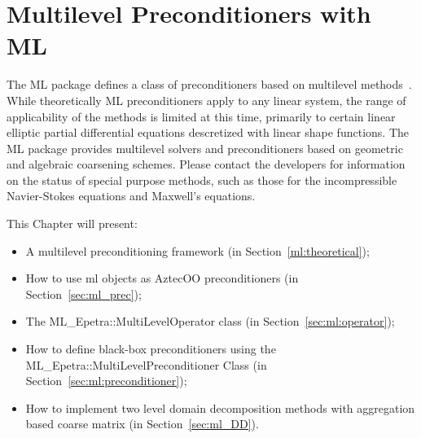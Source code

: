 % 
% 
% 
%  
%  
% 
\chapter{Multilevel Preconditioners with ML}
\label{chap:ml}


\begin{introchapter}
The ML package defines a class of preconditioners based on multilevel
methods~\cite{Briggs2000,TuminaroTong:00a}. 
While theoretically ML preconditioners apply to any linear system,
the range of applicability of the methods is limited at this time,
primarily to certain linear elliptic partial differential equations
descretized with linear shape functions.
The ML package provides multilevel solvers and preconditioners based on
geometric and algebraic coarsening schemes.
Please contact the developers for information on the status of special purpose
methods, such as those for the incompressible Navier-Stokes equations
and Maxwell's equations.

This Chapter will present:
\begin{itemize}
\item A multilevel preconditioning framework (in Section~\ref{ml:theoretical});
\item How to use ml objects as AztecOO preconditioners (in
  Section~\ref{sec:ml_prec});
\item The ML\_Epetra::MultiLevelOperator class (in
  Section~\ref{sec:ml:operator});
\item How to define black-box preconditioners using the
  ML\_Epetra::MultiLevelPreconditioner Class (in
  Section~\ref{sec:ml:preconditioner});
\item How to implement two level domain decomposition methods with
  aggregation based coarse matrix (in Section~\ref{sec:ml_DD}).
\end{itemize}
\end{introchapter}

